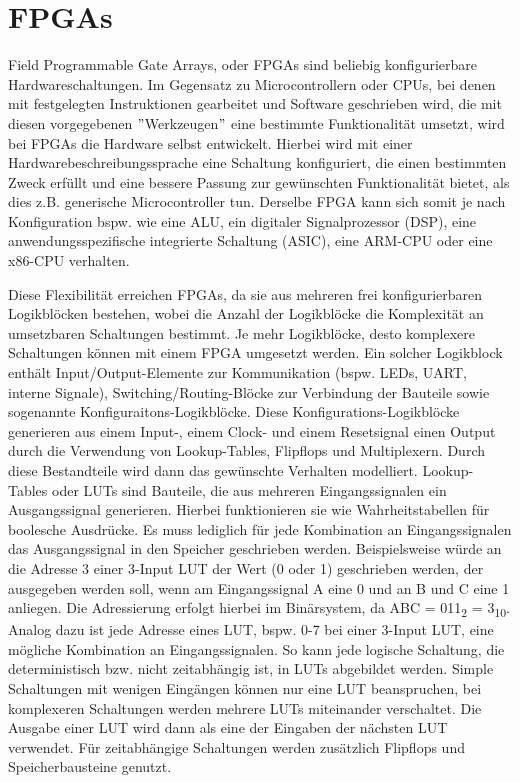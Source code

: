\section{FPGAs}
    Field Programmable Gate Arrays, oder FPGAs sind beliebig konfigurierbare Hardwareschaltungen.
    Im Gegensatz zu Microcontrollern oder CPUs, bei denen mit festgelegten Instruktionen gearbeitet und Software geschrieben wird, die mit diesen vorgegebenen \("\)Werkzeugen\("\) eine bestimmte Funktionalität umsetzt, wird bei FPGAs die Hardware selbst entwickelt.
    Hierbei wird mit einer Hardwarebeschreibungssprache eine Schaltung konfiguriert, die einen bestimmten Zweck erfüllt und eine bessere Passung zur gewünschten Funktionalität bietet, als dies z.B. generische Microcontroller tun.
    Derselbe FPGA kann sich somit je nach Konfiguration bspw. wie eine ALU, ein digitaler Signalprozessor (DSP), eine anwendungsspezifische integrierte Schaltung (ASIC), eine ARM-CPU oder eine x86-CPU verhalten.

    Diese Flexibilität erreichen FPGAs, da sie aus mehreren frei konfigurierbaren Logikblöcken bestehen, wobei die Anzahl der Logikblöcke die Komplexität an umsetzbaren Schaltungen bestimmt.
    Je mehr Logikblöcke, desto komplexere Schaltungen können mit einem FPGA umgesetzt werden.
    Ein solcher Logikblock enthält Input/Output-Elemente zur Kommunikation (bspw. LEDs, UART, interne Signale), Switching/Routing-Blöcke zur Verbindung der Bauteile sowie sogenannte Konfiguraitons-Logikblöcke.
    Diese Konfigurations-Logikblöcke generieren aus einem Input-, einem Clock- und einem Resetsignal einen Output durch die Verwendung von Lookup-Tables, Flipflops und Multiplexern.
    Durch diese Bestandteile wird dann das gewünschte Verhalten modelliert.
    Lookup-Tables oder LUTs sind Bauteile, die aus mehreren Eingangssignalen ein Ausgangssignal generieren.
    Hierbei funktionieren sie wie Wahrheitstabellen für boolesche Ausdrücke.
    Es muss lediglich für jede Kombination an Eingangssignalen das Ausgangssignal in den Speicher geschrieben werden.
    Beispielsweise würde an die Adresse 3 einer 3-Input LUT der Wert (0 oder 1) geschrieben werden, der ausgegeben werden soll, wenn am Eingangssignal A eine 0 und an B und C eine 1 anliegen.
    Die Adressierung erfolgt hierbei im Binärsystem, da ABC = 011\textsubscript{2} = 3\textsubscript{10}.
    Analog dazu ist jede Adresse eines LUT, bspw. 0-7 bei einer 3-Input LUT, eine mögliche Kombination an Eingangssignalen.
    So kann jede logische Schaltung, die deterministisch bzw. nicht zeitabhängig ist, in LUTs abgebildet werden.
    Simple Schaltungen mit wenigen Eingängen können nur eine LUT beanspruchen, bei komplexeren Schaltungen werden mehrere LUTs miteinander verschaltet.
    Die Ausgabe einer LUT wird dann als eine der Eingaben der nächsten LUT verwendet.
    Für zeitabhängige Schaltungen werden zusätzlich Flipflops und Speicherbausteine genutzt.

